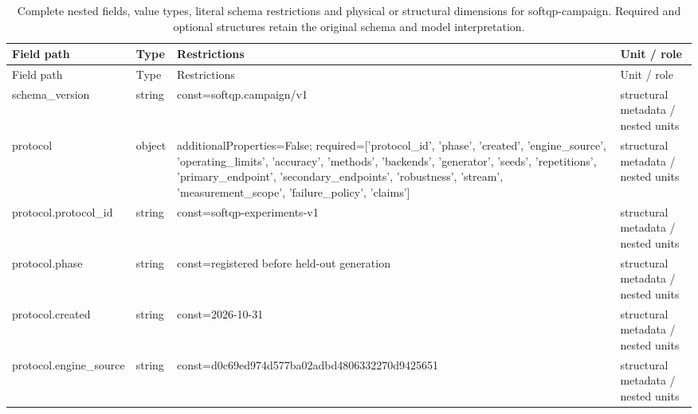 \begingroup\footnotesize\setlength{\tabcolsep}{3pt}
\begin{longtable}{@{}>{\raggedright\arraybackslash}p{}>{\raggedright\arraybackslash}p{}>{\raggedright\arraybackslash}p{}>{\raggedright\arraybackslash}p{}@{}}
\caption{Complete nested fields, value types, literal schema restrictions and physical or structural dimensions for softqp-campaign. Required and optional structures retain the original schema and model interpretation.}\label{tab:nested-softqp-campaign}\\ %
\toprule Field path & Type & Restrictions & Unit / role\\\midrule\endfirsthead
\toprule Field path & Type & Restrictions & Unit / role\\\midrule\endhead
\bottomrule\endfoot
schema\_\allowbreak{}version & string & const=\allowbreak{}softqp.\allowbreak{}campaign/\allowbreak{}v1 & structural metadata /\allowbreak{} nested units\\ %
protocol & object & additionalProperties=\allowbreak{}False; required=\allowbreak{}['protocol\_\allowbreak{}id', 'phase', 'created', 'engine\_\allowbreak{}source', 'operating\_\allowbreak{}limits', 'accuracy', 'methods', 'backends', 'generator', 'seeds', 'repetitions', 'primary\_\allowbreak{}endpoint', 'secondary\_\allowbreak{}endpoints', 'robustness', 'stream', 'measurement\_\allowbreak{}scope', 'failure\_\allowbreak{}policy', 'claims'] & structural metadata /\allowbreak{} nested units\\
protocol.\allowbreak{}protocol\_\allowbreak{}id & string & const=\allowbreak{}softqp-\allowbreak{}experiments-\allowbreak{}v1 & structural metadata /\allowbreak{} nested units\\
protocol.\allowbreak{}phase & string & const=\allowbreak{}registered before held-\allowbreak{}out generation & structural metadata /\allowbreak{} nested units\\
protocol.\allowbreak{}created & string & const=\allowbreak{}2026-10-31 & structural metadata /\allowbreak{} nested units\\
protocol.\allowbreak{}engine\_\allowbreak{}source & string & const=\allowbreak{}d0c69ed9\allowbreak{}74d577ba\allowbreak{}02adbd48\allowbreak{}06332270\allowbreak{}d9425651 & structural metadata /\allowbreak{} nested units\\

\end{longtable}
